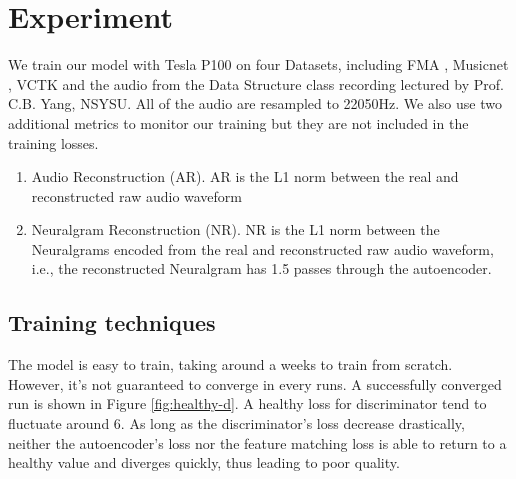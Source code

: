 \documentclass[12pt]{article}
\begin{document}
\section{Experiment}
We train our model with Tesla P100 on four Datasets, including FMA \cite{kir16}, Musicnet \cite{joh18}, VCTK \cite{yam19} and the audio from the Data Structure class recording \cite{chu21} lectured by Prof. C.B. Yang, NSYSU. All of the audio are resampled to 22050Hz. We also use two additional metrics to monitor our training but they are not included in the training losses.
\begin{enumerate}
  \item{Audio Reconstruction (AR). AR is the L1 norm between the real and reconstructed raw audio waveform}
  \item{Neuralgram Reconstruction (NR). NR is the L1 norm between the Neuralgrams encoded from the real and reconstructed raw audio waveform, i.e., the reconstructed Neuralgram has 1.5 passes through the autoencoder.}
\end{enumerate}

\subsection{Training techniques} The model is easy to train, taking around a weeks to train from scratch. However, it's not guaranteed to converge in every runs. A successfully converged run is shown in Figure \ref{fig:healthy-d}. A healthy loss for discriminator tend to fluctuate around 6. As long as the discriminator's loss decrease drastically, neither the autoencoder's loss nor the feature matching loss is able to return to a healthy value and diverges quickly, thus leading to poor quality. 




\end{document}
